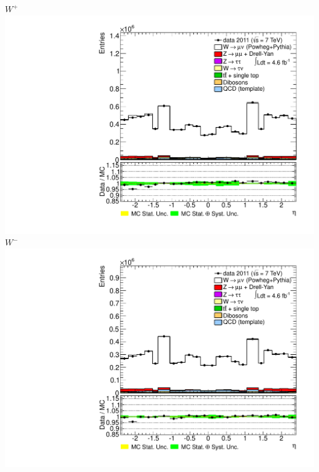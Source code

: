 {
\colb[T]
\centering
\small{ $W^{+}$}
\includegraphics[width=1.0\textwidth]{dates/20130403/figures/old/STACKS/CONTROL25/P_stack_d3_eta_lpt_met_y_2__1_z_0__1_POS}
\centering
\small{ $W^{-}$}
\includegraphics[width=1.0\textwidth]{dates/20130403/figures/old/STACKS/CONTROL25/P_stack_d3_eta_lpt_met_y_2__1_z_0__1_NEG}
\cole
}

